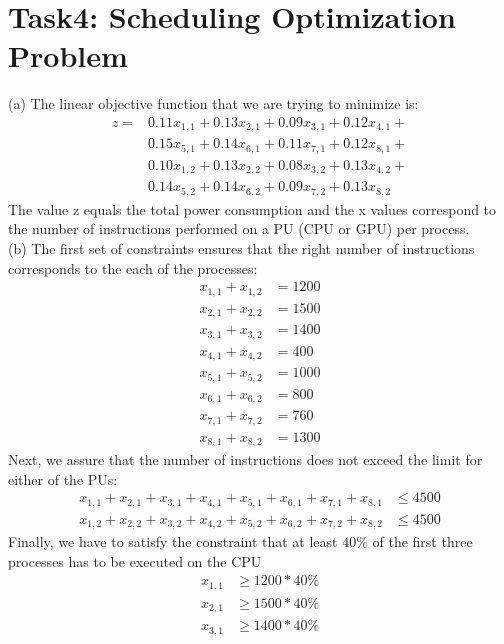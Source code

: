 \documentclass{article}
\begin{document}
\newpage
\section{Task4: Scheduling Optimization Problem}
(a) The linear objective function that we are trying to minimize is:
\begin{equation}
\label{tpc}
\begin{split}
    z = &0.11x_{1,1} + 0.13x_{2,1} + 0.09x_{3,1} + 0.12x_{4,1} + \\
    &0.15x_{5,1} + 0.14x_{6,1} + 0.11x_{7,1} + 0.12x_{8,1} + \\ 
    &0.10x_{1,2} + 0.13x_{2,2} + 0.08x_{3,2} + 0.13x_{4,2} + \\
    &0.14x_{5,2} + 0.14x_{6,2} + 0.09x_{7,2} + 0.13x_{8,2}
\end{split}
\end{equation}
The value z equals the total power consumption and the x values correspond to the number of instructions performed on a PU (CPU or GPU) per process.\\

(b) The first set of constraints ensures that the right number of instructions corresponds to the each of the processes:
\begin{equation*}
\begin{split}
    x_{1, 1} + x_{1, 2} &= 1200\\
    x_{2, 1} + x_{2, 2} &= 1500\\
    x_{3, 1} + x_{3, 2} &= 1400\\
    x_{4, 1} + x_{4, 2} &= 400\\
    x_{5, 1} + x_{5, 2} &= 1000\\
    x_{6, 1} + x_{6, 2} &= 800\\
    x_{7, 1} + x_{7, 2} &= 760\\
    x_{8, 1} + x_{8, 2} &= 1300
\end{split}
\end{equation*}
Next, we assure that the number of instructions does not exceed the limit for either of the PUs:
\begin{equation*}
\begin{split}
    x_{1, 1} + x_{2, 1} +x_{3, 1} + x_{4, 1} + x_{5, 1} +x_{6, 1} + x_{7, 1} +x_{8, 1} &\leq 4500 \\
    x_{1, 2} + x_{2, 2} +x_{3, 2} + x_{4, 2} + x_{5, 2} +x_{6, 2} + x_{7, 2} +x_{8, 2} &\leq 4500
\end{split}
\end{equation*}
Finally, we have to satisfy the constraint that at least 40\% of the first three processes has to be executed on the CPU
\begin{equation*}
\begin{split}
    x_{1, 1} &\geq 1200*40\%\\
    x_{2, 1} &\geq 1500*40\%\\
    x_{3, 1} &\geq 1400*40\%
\end{split}
\end{equation*} \\
\end{document}
